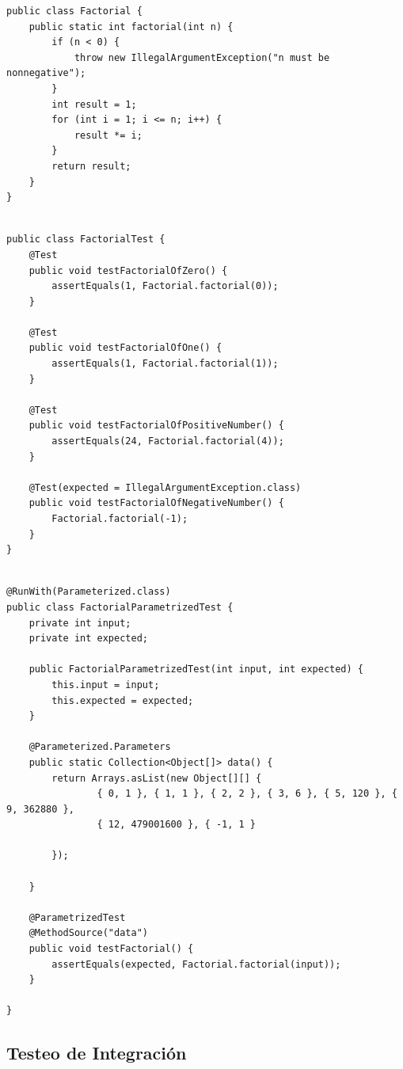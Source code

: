 \begin{paracol}{2}
	\colfill
\begin{lstlisting}[caption={Ejemplo de clase Factorial}]
public class Factorial {
	public static int factorial(int n) {
		if (n < 0) {
			throw new IllegalArgumentException("n must be nonnegative");
		}
		int result = 1;
		for (int i = 1; i <= n; i++) {
			result *= i;
		}
		return result;
	}
}
\end{lstlisting}
\colfill

\switchcolumn

\begin{lstlisting}[caption={Ejemplo de clase de test de  Factorial}]

public class FactorialTest {
	@Test
	public void testFactorialOfZero() {
		assertEquals(1, Factorial.factorial(0));
	}

	@Test
	public void testFactorialOfOne() {
		assertEquals(1, Factorial.factorial(1));
	}

	@Test
	public void testFactorialOfPositiveNumber() {
		assertEquals(24, Factorial.factorial(4));
	}

	@Test(expected = IllegalArgumentException.class)
	public void testFactorialOfNegativeNumber() {
		Factorial.factorial(-1);
	}
}
	
\end{lstlisting}
\end{paracol}

\begin{lstlisting}
@RunWith(Parameterized.class)
public class FactorialParametrizedTest {
	private int input;
	private int expected;

	public FactorialParametrizedTest(int input, int expected) {
		this.input = input;
		this.expected = expected;
	}

	@Parameterized.Parameters
	public static Collection<Object[]> data() {
		return Arrays.asList(new Object[][] {
				{ 0, 1 }, { 1, 1 }, { 2, 2 }, { 3, 6 }, { 5, 120 }, { 9, 362880 },
				{ 12, 479001600 }, { -1, 1 }

		});

	}

	@ParametrizedTest
	@MethodSource("data")
	public void testFactorial() {
		assertEquals(expected, Factorial.factorial(input));
	}

}
\end{lstlisting}
\subsection{Testeo de Integración}


